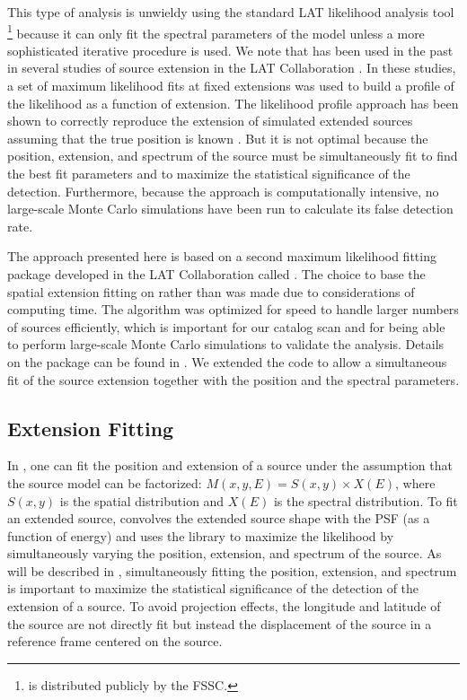 This type of analysis is unwieldy using the standard LAT likelihood
analysis tool \gtlike\footnote{\gtlike is distributed publicly by the
FSSC.} because it can only fit the spectral parameters of the model
unless a more sophisticated iterative procedure is used.  
We note that \gtlike has been used in the
past in several studies of source extension in the LAT Collaboration
\citep{abdo_2010a_observations-large,abdo_2010a_detection-small,abdo_2010d_fermi-large,abdo_2009a_fermi-discovery}.  In these studies, a 
set of \gtlike maximum likelihood fits at fixed extensions was used
to build a profile of the likelihood as a function of extension.
The \gtlike likelihood profile approach has been shown to correctly
reproduce the extension of simulated extended sources assuming that the
true position is known \citep{giordano_2011a_extension-studies}.  But it is not optimal
because the position, extension, and spectrum of the source must be
simultaneously fit to find the best fit parameters and to maximize the
statistical significance of the detection.  Furthermore, because the \gtlike
approach is computationally intensive, no large-scale Monte Carlo
simulations have been run to calculate its false detection rate.

The approach presented here is based on a second maximum likelihood
fitting package developed in the LAT Collaboration called \pointlike
\citep{abdo_2010b_fermi-large,kerr_2010a_likelihood-methods}.  The choice to base the
spatial extension fitting on \pointlike rather than \gtlike was made
due to considerations of computing time.  The \pointlike algorithm was
optimized for speed to handle larger numbers of sources efficiently,
which is important for our catalog scan and for being able
to perform large-scale Monte Carlo simulations to validate the analysis.
Details on the \pointlike package can be
found in \cite{kerr_2010a_likelihood-methods}.  We extended the code to allow a
simultaneous fit of the source extension together with the position and
the spectral parameters.

\subsection{Extension Fitting}

In \pointlike, one can fit the position and extension 
of a source under the assumption that the source model
can be factorized:
$M(x,y,E)=S(x,y)\times X(E)$, where $S(x,y)$ is the spatial distribution
and $X(E)$ is the spectral distribution.  To fit an extended source,
\pointlike convolves the extended source shape with the PSF (as a function
of energy) and uses the \minuit library \citep{james_1975a_minuit-system}
to maximize the likelihood by simultaneously varying the position,
extension, and spectrum of the source.  As will be described in
, simultaneously fitting the
position, extension, and spectrum is important to maximize
the statistical significance of the detection of the extension of a source.
To avoid projection effects, the longitude and latitude 
of the source are
not directly fit but instead the displacement of the source 
in a reference frame centered on the source.

